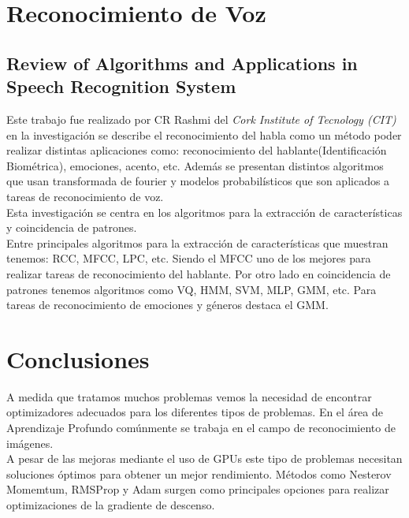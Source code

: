 \section{Reconocimiento de Voz}
\subsection{Review of Algorithms and Applications in Speech Recognition System}
Este trabajo fue realizado por CR Rashmi del \textit{ Cork Institute of Tecnology (CIT) } en la investigación se describe el reconocimiento del habla como un método poder realizar distintas aplicaciones como: reconocimiento del hablante(Identificación Biométrica), emociones, acento, etc. Además se presentan distintos algoritmos que usan transformada de fourier y modelos probabilísticos que son aplicados a tareas de reconocimiento de voz.\\ Esta investigación se centra en los algoritmos para la extracción de características y coincidencia de patrones.\\ Entre principales algoritmos para la extracción de características que muestran tenemos: RCC, MFCC, LPC, etc. Siendo el MFCC uno de los mejores para realizar tareas de reconocimiento del hablante. Por otro lado en coincidencia de patrones tenemos algoritmos como VQ, HMM, SVM, MLP, GMM, etc. Para tareas de reconocimiento de emociones y géneros destaca el GMM.

\section{Conclusiones}
A medida que tratamos muchos problemas vemos la necesidad de encontrar optimizadores adecuados para los diferentes tipos de problemas. En el área de Aprendizaje Profundo comúnmente se trabaja en el campo de reconocimiento de imágenes.\\ A pesar de las mejoras mediante el uso de GPUs este tipo de problemas necesitan soluciones óptimos para obtener un mejor rendimiento. Métodos como Nesterov Momemtum, RMSProp y Adam surgen como principales opciones para realizar optimizaciones de la gradiente de descenso.

